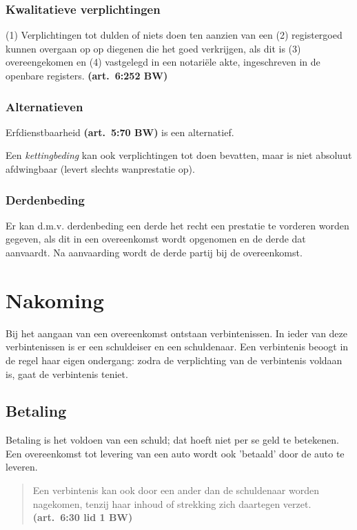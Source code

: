 \documentclass[a4paper]{article}
\newcommand{\art}[1]{\textbf{(art.~#1 BW)}\xspace}
\begin{document}
\subsubsection{Kwalitatieve verplichtingen}

(1) Verplichtingen tot dulden of niets doen ten aanzien van een (2)
registergoed kunnen overgaan op op diegenen die het goed verkrijgen, als dit
is (3) overeengekomen en (4) vastgelegd in een notariële akte, ingeschreven in
de openbare registers. \art{6:252}

\subsubsection{Alternatieven}

Erfdienstbaarheid \art{5:70} is een alternatief.

Een \emph{kettingbeding} kan ook verplichtingen tot doen bevatten, maar is
niet absoluut afdwingbaar (levert slechts wanprestatie op).

\subsubsection{Derdenbeding}

Er kan d.m.v. derdenbeding een derde het recht een prestatie te vorderen
worden gegeven, als dit in een overeenkomst wordt opgenomen en de derde dat
aanvaardt. Na aanvaarding wordt de derde partij bij de overeenkomst.



\section{Nakoming}

Bij het aangaan van een overeenkomst ontstaan verbintenissen. In ieder van
deze verbintenissen is er een schuldeiser en een schuldenaar. Een verbintenis
beoogt in de regel haar eigen ondergang: zodra de verplichting van de
verbintenis voldaan is, gaat de verbintenis teniet.

\subsection{Betaling}

Betaling is het voldoen van een schuld; dat hoeft niet per se geld te
betekenen. Een overeenkomst tot levering van een auto wordt ook 'betaald' door
de auto te leveren.

\begin{quote}
  
  Een verbintenis kan ook door een ander dan de schuldenaar worden nagekomen,
  tenzij haar inhoud of strekking zich daartegen verzet. \art{6:30 lid 1}

\end{quote}
\end{document}
